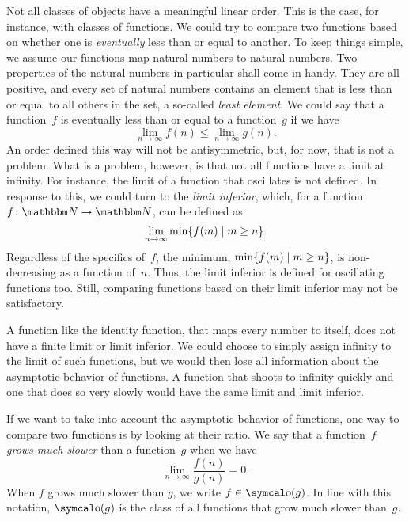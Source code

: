 Not all classes of objects have a meaningful linear order.
This is the case, for instance, with classes of functions.
We could try to compare two functions based on whether one is \emph{eventually} less than or equal to another.
To keep things simple, we assume our functions map natural numbers to natural numbers.
Two properties of the natural numbers in particular shall come in handy.
They are all positive, and every set of natural numbers contains an element that is less than or equal to all others in the set, a so-called \emph{least element}.
We could say that a function~$f$ is eventually less than or equal to a function~$g$ if we have
\begin{equation*}
  \lim_{n \to \infty} f(n) \le \lim_{n \to \infty} g(n).
\end{equation*}
An order defined this way will not be antisymmetric, but, for now, that is not a problem.
What is a problem, however, is that not all functions have a limit at infinity.
For instance, the limit of a function that oscillates is not defined.
In response to this, we could turn to the \emph{limit inferior}, which, for a function~$f\colon \bbN \to \bbN$, can be defined as
\begin{equation*}
\label{def:liminf}
  \lim_{n \to \infty} \min \{f(m) \;|\; m \ge n\}.
\end{equation*}
Regardless of the specifics of~$f$, the minimum, $\min \{f(m) \;|\; m \ge n\}$, is non-decreasing as a function of~$n$.
Thus, the limit inferior is defined for oscillating functions too.
Still, comparing functions based on their limit inferior may not be satisfactory.

A function like the identity function, that maps every number to itself, does not have a finite limit or limit inferior.
We could choose to simply assign infinity to the limit of such functions, but we would then lose all information about the asymptotic behavior of functions.
A function that shoots to infinity quickly and one that does so very slowly would have the same limit and limit inferior.

If we want to take into account the asymptotic behavior of functions, one way to compare two functions is by looking at their ratio.
We say that a function~$f$ \emph{grows much slower} than a function~$g$ when we have
\begin{equation*}
  \lim_{n \to \infty} \frac{f(n)}{g(n)} = 0.
\end{equation*}
When $f$ grows much slower than $g$, we write $f \in \littleo(g)$.
In line with this notation, $\littleo(g)$ is the class of all functions that grow much slower than~$g$.

